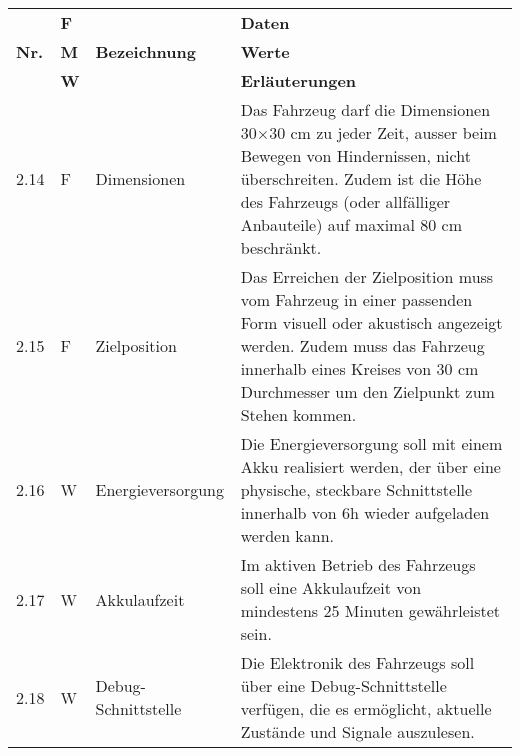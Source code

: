 \documentclass[main.tex]{subfiles} %
\begin{document}
\newpage

\begin{tabular}{|l|p{0.5cm}|p{4cm}|p{10cm}|}
  \hline
               & \textbf{F} &                           & \textbf{Daten}                                                                                                                                                                                                              \\
  \textbf{Nr.} & \textbf{M} & \textbf{Bezeichnung}      & \textbf{Werte}                                                                                                                                                                                                              \\
               & \textbf{W} &                           & \textbf{Erläuterungen}                                                                                                                                                                                                      \\
  \hline
  2.14         & F          & Dimensionen               & Das Fahrzeug darf die Dimensionen 30$\times$30 cm zu jeder Zeit, ausser beim Bewegen von Hindernissen, nicht überschreiten. Zudem ist die Höhe des Fahrzeugs (oder allfälliger Anbauteile) auf maximal 80 cm beschränkt.    \\
  \hline
  2.15         & F          & Zielposition              & Das Erreichen der Zielposition muss vom Fahrzeug in einer passenden Form visuell oder akustisch angezeigt werden. Zudem muss das Fahrzeug innerhalb eines Kreises von 30 cm Durchmesser um den Zielpunkt zum Stehen kommen. \\
  \hline
  2.16         & W          & Energieversorgung         & Die Energieversorgung soll mit einem Akku realisiert werden, der über eine physische, steckbare Schnittstelle innerhalb von 6h wieder aufgeladen werden kann.                                                               \\
  \hline
  2.17         & W          & Akkulaufzeit              & Im aktiven Betrieb des Fahrzeugs soll eine Akkulaufzeit von mindestens 25 Minuten gewährleistet sein.                                                                                                                       \\
  \hline
  2.18         & W          & Debug-Schnittstelle       & Die Elektronik des Fahrzeugs soll über eine Debug-Schnittstelle verfügen, die es ermöglicht, aktuelle Zustände und Signale auszulesen.                                                                                      \\

\end{tabular}
\end{document}
